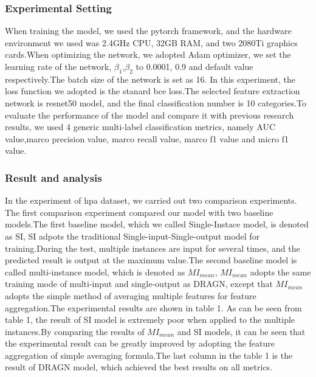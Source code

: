 \documentclass[10pt,twocolumn,letterpaper]{article}
\begin{document}
\subsubsection{Experimental Setting}
When training the model, we used the pytorch framework, and the hardware environment we used was 2.4GHz CPU, 32GB RAM, and two 2080Ti graphics cards.When optimizing the network, we adopted Adam optimizer\cite{ref25}, we set the learning rate of the network, $\beta_1$,$\beta_2$ to 0.0001, 0.9 and default value respectively.The batch size of the network is set as 16. In this experiment, the loss function we adopted is the stanard bce loss.The selected feature extraction network is resnet50 model, and the final classification number is 10 categories.To evaluate the performance of the model and compare it with previous research results, we used 4 generic multi-label classification metrics, namely AUC value,marco precision value, marco recall value, marco f1 value and micro f1 value.

\subsubsection{Result and analysis}
In the experiment of hpa dataset, we carried out two comparison experiments. The first comparison experiment compared our model with two baseline models.The first baseline model, which we called Single-Instace model, is denoted as SI, SI adpots the traditional Single-input-Single-output model for training.During the test, multiple instances are input for several times, and the predicted result is output at the maximum value.The second baseline model is called multi-instance model, which is denoted as $MI_{mean}$, $MI_{mean}$ adopts the same training mode of multi-input and single-output as DRAGN, except that $MI_{mean}$ adopts the simple method of averaging multiple features for feature aggregation.The experimental results are shown in table 1. As can be seen from table 1, the result of SI model is extremely poor when applied to the multiple instances.By comparing the results of $MI_{mean}$ and SI models, it can be seen that the experimental result can be greatly improved by adopting the feature aggregation of simple averaging formula.The last column in the table 1 is the result of DRAGN model, which achieved the best results on all metrics.
\end{document}
